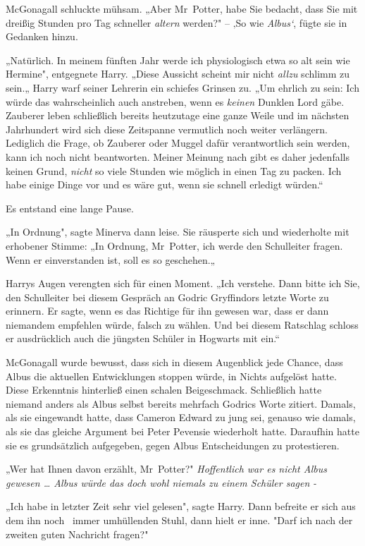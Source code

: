 {McGonagall schluckte mühsam. „Aber Mr~Potter, habe Sie bedacht, dass Sie mit dreißig Stunden pro Tag schneller \emph{altern} werden?" -- ‚So wie \emph{Albus`}, fügte sie in Gedanken hinzu.

„Natürlich. In meinem fünften Jahr werde ich physiologisch etwa so alt sein wie Hermine", entgegnete Harry. „Diese Aussicht scheint mir nicht \emph{allzu} schlimm zu sein.„ Harry warf seiner Lehrerin ein schiefes Grinsen zu. „Um ehrlich zu sein: Ich würde das wahrscheinlich auch anstreben, wenn es \emph{keinen} Dunklen Lord gäbe. Zauberer leben schließlich bereits heutzutage eine ganze Weile und im nächsten Jahrhundert wird sich diese Zeitspanne vermutlich noch weiter verlängern. Lediglich die Frage, ob Zauberer oder Muggel dafür verantwortlich sein werden, kann ich noch nicht beantworten. Meiner Meinung nach gibt es daher jedenfalls keinen Grund, \emph{nicht} so viele Stunden wie möglich in einen Tag zu packen. Ich habe einige Dinge vor und es wäre gut, wenn sie schnell erledigt würden.“

Es entstand eine lange Pause.

„In Ordnung", sagte Minerva dann leise. Sie räusperte sich und wiederholte mit erhobener Stimme: „In Ordnung, Mr~Potter, ich werde den Schulleiter fragen. Wenn er einverstanden ist, soll es so geschehen.„

Harrys Augen verengten sich für einen Moment. „Ich verstehe. Dann bitte ich Sie, den Schulleiter bei diesem Gespräch an Godric Gryffindors letzte Worte zu erinnern. Er sagte, wenn es das Richtige für ihn gewesen war, dass er dann niemandem empfehlen würde, falsch zu wählen. Und bei diesem Ratschlag schloss er ausdrücklich auch die jüngsten Schüler in Hogwarts mit ein.“

McGonagall wurde bewusst, dass sich in diesem Augenblick jede Chance, dass Albus die aktuellen Entwicklungen stoppen würde, in Nichts aufgelöst hatte. Diese Erkenntnis hinterließ einen schalen Beigeschmack. Schließlich hatte niemand anders als Albus selbst bereits mehrfach Godrics Worte zitiert. Damals, als sie eingewandt hatte, dass Cameron Edward zu jung sei, genauso wie damals, als sie das gleiche Argument bei Peter Pevensie wiederholt hatte. Daraufhin hatte sie es grundsätzlich aufgegeben, gegen Albus Entscheidungen zu protestieren.

„Wer hat Ihnen davon erzählt, Mr~Potter?" \emph{Hoffentlich war es nicht Albus gewesen … Albus würde das doch wohl niemals zu einem Schüler sagen} \emph{-}

„Ich habe in letzter Zeit sehr viel gelesen", sagte Harry. Dann befreite er sich aus dem ihn noch ~immer umhüllenden Stuhl, dann hielt er inne. "Darf ich nach der zweiten guten Nachricht fragen?"

}
